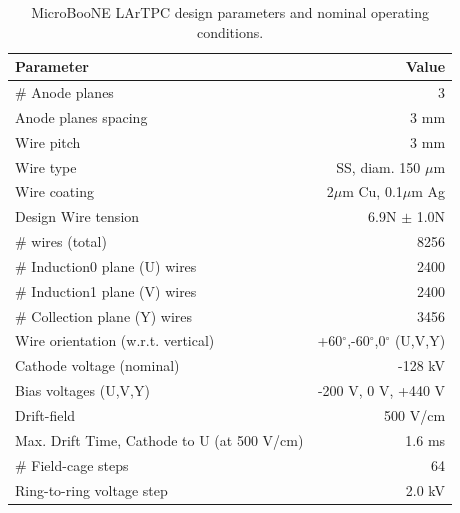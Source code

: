 \begin{table}[!htb]
   \centering
     \caption{MicroBooNE LArTPC design parameters and nominal operating conditions.} 
    \begin{tabular}{lr} %
    \hline
    Parameter & Value \\
    \hline
    $\#$ Anode planes & 3\\
     Anode planes spacing& 3 mm \\
     Wire pitch & 3 mm  \\
     Wire type & SS, diam. 150 $\mu$m\\
     Wire coating & 2$\mu$m Cu, 0.1$\mu$m Ag\\
     Design Wire tension & 6.9N $\pm$ 1.0N\\
     $\#$ wires (total) & 8256 \\
     $\#$ Induction0 plane (U) wires & 2400 \\
     $\#$ Induction1 plane (V) wires & 2400 \\
     $\#$ Collection plane (Y) wires & 3456 \\
     Wire orientation (w.r.t. vertical) & +60$^{\circ}$,-60$^{\circ}$,0$^{\circ}$ (U,V,Y) \\
     \hline
     Cathode voltage (nominal) & -128 kV \\
     Bias voltages (U,V,Y) & -200 V, 0 V, +440 V \\
     Drift-field & 500 V/cm\\
     Max. Drift Time, Cathode to U (at 500 V/cm) & 1.6 ms\\
    \hline
    $\#$ Field-cage steps & 64\\
    Ring-to-ring voltage step & 2.0 kV\\
    \hline
   \end{tabular}
   \label{UB_TPC_stats_table}
\end{table} 



